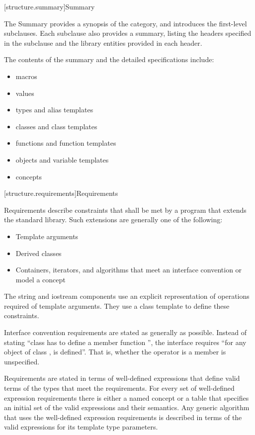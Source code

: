 [structure.summary]{Summary}

\pnum
The Summary provides a synopsis of the category, and introduces the first-level subclauses.
Each subclause also provides a summary, listing the headers specified in the
subclause and the library entities provided in each header.

\pnum
The contents of the summary and the detailed specifications include:
\begin{itemize}
\item macros
\item values
\item types and alias templates
\item classes and class templates
\item functions and function templates
\item objects and variable templates
\item concepts
\end{itemize}

[structure.requirements]{Requirements}

\pnum
{}%
Requirements describe constraints that shall be met by a \Cpp{} program that extends the standard library.
Such extensions are generally one of the following:
\begin{itemize}
\item Template arguments
\item Derived classes
\item Containers, iterators, and algorithms that meet an interface convention or
  model a concept
\end{itemize}

\pnum
The string and iostream components use an explicit representation of operations
required of template arguments. They use a class template  to
define these constraints.

\pnum
Interface convention requirements are stated as generally as possible. Instead
of stating ``class  has to define a member function '', the
interface requires ``for any object  of class ,  is
defined''. That is, whether the operator is a member is unspecified.

\pnum
Requirements are stated in terms of well-defined expressions that define valid terms of
the types that meet the requirements. For every set of well-defined expression
requirements there is either a named concept or a table that specifies an initial set of the valid expressions and
their semantics. Any generic algorithm that uses the
well-defined expression requirements is described in terms of the valid expressions for
its template type parameters.

